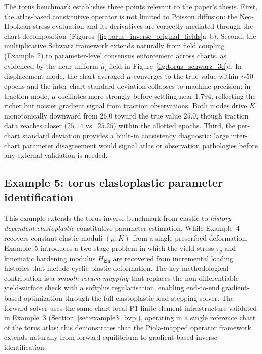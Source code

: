 \documentclass[sort&compress]{svjour3} %
\begin{document}
The torus benchmark establishes three points relevant to the paper's thesis. First, the atlas-based constitutive operator is not limited to Poisson diffusion: the Neo-Hookean stress evaluation and its derivatives are correctly mediated through the chart decomposition (Figures~\ref{fig:torus_inverse_original_fields}a--b). Second, the multiplicative Schwarz framework extends naturally from field coupling (Example~2) to parameter-level consensus enforcement across charts, as evidenced by the near-uniform $\hat{\mu}_i$ field in Figure~\ref{fig:torus_schwarz_3d}d. In displacement mode, the chart-averaged $\mu$ converges to the true value within ${\sim}50$ epochs and the inter-chart standard deviation collapses to machine precision; in traction mode, $\mu$ oscillates more strongly before settling near $1.794$, reflecting the richer but noisier gradient signal from traction observations. Both modes drive $K$ monotonically downward from $26.0$ toward the true value $25.0$, though traction data reaches closer ($25.14$ vs.\ $25.25$) within the allotted epochs. Third, the per-chart standard deviation provides a built-in consistency diagnostic: large inter-chart parameter disagreement would signal atlas or observation pathologies before any external validation is needed.

\subsection{Example 5: torus elastoplastic parameter identification}
\label{sec:example5_ep}

This example extends the torus inverse benchmark from elastic to \emph{history-dependent elastoplastic} constitutive parameter estimation. While Example~4 recovers constant elastic moduli $(\mu,K)$ from a single prescribed deformation, Example~5 introduces a two-stage problem in which the yield stress $\tau_y$ and kinematic hardening modulus $H_{\mathrm{kin}}$ are recovered from incremental loading histories that include cyclic plastic deformation. The key methodological contribution is a \emph{smooth return mapping} that replaces the non-differentiable yield-surface check with a softplus regularisation, enabling end-to-end gradient-based optimization through the full elastoplastic load-stepping solver. The forward solver uses the same chart-local P1 finite-element infrastructure validated in Example~3 (Section~\ref{sec:example3_bvp}), operating in a single reference chart of the torus atlas; this demonstrates that the Piola-mapped operator framework extends naturally from forward equilibrium to gradient-based inverse identification.
\end{document}
